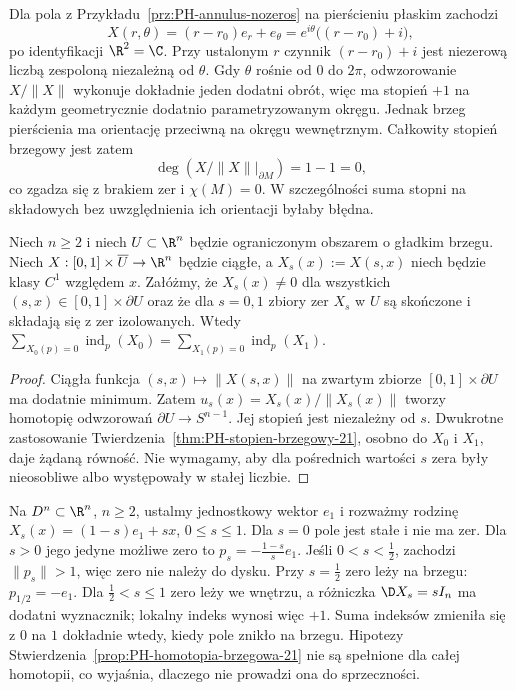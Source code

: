 \begin{przyklad}
\label{prz:PH-stopien-pierscien-21}
Dla pola z Przykładu~\ref{prz:PH-annulus-nozeros}
na pierścieniu płaskim zachodzi
\[
 X(r,\theta)=(r-r_0)e_r+e_\theta
   =e^{i\theta}\bigl((r-r_0)+i\bigr),
\]
po identyfikacji $\R^2=\C$.
Przy ustalonym $r$ czynnik $(r-r_0)+i$ jest
niezerową liczbą zespoloną niezależną od $\theta$.
Gdy $\theta$ rośnie od $0$ do $2\pi$,
odwzorowanie $X/\|X\|$ wykonuje dokładnie
jeden dodatni obrót, więc ma stopień $+1$
na każdym geometrycznie dodatnio parametryzowanym
okręgu. Jednak brzeg pierścienia ma orientację
przeciwną na okręgu wewnętrznym. Całkowity
stopień brzegowy jest zatem
\[
 \deg(X/\|X\|\big|_{\partial M})=1-1=0,
\]
co zgadza się z brakiem zer i $\chi(M)=0$.
W szczególności suma stopni na składowych
bez uwzględnienia ich orientacji byłaby błędna.
\end{przyklad}

\begin{stwierdzenie}
\label{prop:PH-homotopia-brzegowa-21}
Niech $n\ge2$ i niech $U\subset\R^n$ będzie ograniczonym
obszarem o gładkim brzegu. Niech
$X:[0,1]\times\overline U\to\R^n$ będzie ciągłe,
a $X_s(x):=X(s,x)$ niech będzie klasy $C^1$ względem $x$.
Załóżmy, że $X_s(x)\ne0$ dla wszystkich
$(s,x)\in[0,1]\times\partial U$ oraz że dla $s=0,1$
zbiory zer $X_s$ w $U$ są skończone i składają się
z zer izolowanych. Wtedy
$\sum_{X_0(p)=0}\operatorname{ind}_p(X_0)
 =\sum_{X_1(p)=0}\operatorname{ind}_p(X_1)$.
\end{stwierdzenie}
\begin{proof}
Ciągła funkcja $(s,x)\mapsto\|X(s,x)\|$ na zwartym
zbiorze $[0,1]\times\partial U$ ma dodatnie minimum.
Zatem $u_s(x)=X_s(x)/\|X_s(x)\|$ tworzy homotopię
odwzorowań $\partial U\to S^{n-1}$. Jej stopień
jest niezależny od $s$. Dwukrotne zastosowanie
Twierdzenia~\ref{thm:PH-stopien-brzegowy-21}, osobno
do $X_0$ i $X_1$, daje żądaną równość.
Nie wymagamy, aby dla pośrednich wartości $s$ zera
były nieosobliwe albo występowały w stałej liczbie.
\end{proof}

\begin{przyklad}
\label{prz:PH-przekroczenie-brzegu-21}
Na $D^n\subset\R^n$, $n\ge2$, ustalmy jednostkowy
wektor $e_1$ i rozważmy rodzinę
$X_s(x)=(1-s)e_1+s x$, $0\le s\le1$.
Dla $s=0$ pole jest stałe i nie ma zer. Dla $s>0$
jego jedyne możliwe zero to
$p_s=-\frac{1-s}{s}e_1$.
Jeśli $0<s<\frac12$, zachodzi $\|p_s\|>1$,
więc zero nie należy do dysku. Przy $s=\frac12$
zero leży na brzegu: $p_{1/2}=-e_1$.
Dla $\frac12<s\le1$ zero leży we wnętrzu,
a różniczka $\D X_s=sI_n$ ma dodatni wyznacznik;
lokalny indeks wynosi więc $+1$.
Suma indeksów zmieniła się z $0$ na $1$ dokładnie
wtedy, kiedy pole znikło na brzegu. Hipotezy
Stwierdzenia~\ref{prop:PH-homotopia-brzegowa-21}
nie są spełnione dla całej homotopii, co wyjaśnia,
dlaczego nie prowadzi ona do sprzeczności.
\end{przyklad}

